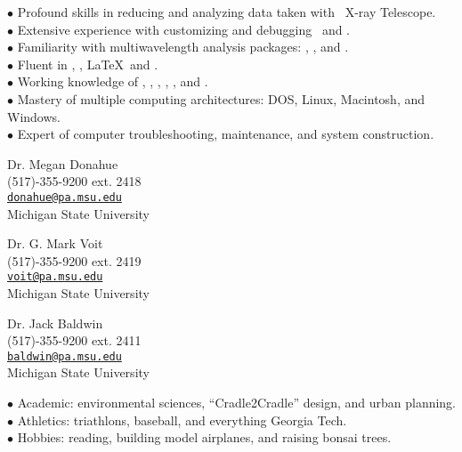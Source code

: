 \documentclass[12pt]{cv}
\begin{document}
\begin{llist}

$\bullet$ Profound skills in reducing and analyzing data taken with \Chandra\ X-ray Telescope.\\
$\bullet$ Extensive experience with customizing and debugging \Ciao\ and \Caldb.\\
$\bullet$ Familiarity with multiwavelength analysis packages: \aips, \iraf, and \pyraf.\\
$\bullet$ Fluent in \perl, \idl, \LaTeX\, and \html.\\
$\bullet$ Working knowledge of \clang, \flash, \fortran, \mysql, \supmo, and \tcl.\\
$\bullet$ Mastery of multiple computing architectures: DOS, Linux, Macintosh, and Windows.\\
$\bullet$ Expert of computer troubleshooting, maintenance, and system construction.



{\sc Dr. Megan Donahue}\\
(517)-355-9200 ext. 2418\\
\href{mailto:donahue@pa.msu.edu}{\tt donahue@pa.msu.edu}\\
Michigan State University

{\sc Dr. G. Mark Voit}\\
(517)-355-9200 ext. 2419\\
\href{mailto:voit@pa.msu.edu}{\tt voit@pa.msu.edu}\\
Michigan State University

{\sc Dr. Jack Baldwin}\\
(517)-355-9200 ext. 2411\\
\href{mailto:baldwin@pa.msu.edu}{\tt baldwin@pa.msu.edu}\\
Michigan State University


$\bullet$ Academic: environmental sciences, ``Cradle2Cradle'' design, and urban planning.\\
$\bullet$ Athletics: triathlons, baseball, and everything Georgia Tech.\\
$\bullet$ Hobbies: reading, building model airplanes, and raising bonsai trees.\\

\end{llist}
\end{document}
